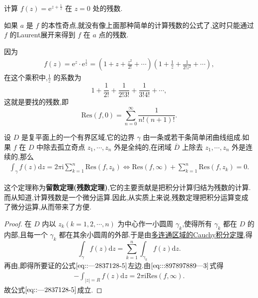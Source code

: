 \documentclass[../../main.tex]{subfiles}%
\begin{document}
\begin{example}
计算 \( f(z) = \mathrm{e}^{z + \frac{1}{z}} \) 在 \( z = 0 \) 处的残数.
\end{example}
\begin{remark}
如果 \( a \) 是 \( f \) 的本性奇点,就没有像上面那种简单的计算残数的公式了,这时只能通过 \( f \) 的Laurent展开来得到 \( f \) 在 \( a \) 点的残数.
\end{remark}
\begin{solution}
因为
\begin{align*}
f(z) = \mathrm{e}^z \cdot \mathrm{e}^{\frac{1}{z}} = \left( 1 + z + \frac{z^2}{2!} + \cdots \right) \left( 1 + \frac{1}{z} + \frac{1}{2! z^2} + \cdots \right),
\end{align*}
在这个乘积中,\( \frac{1}{z} \) 的系数为
\[
1 + \frac{1}{2!} + \frac{1}{2! 3!} + \frac{1}{3! 4!} + \cdots,
\]
这就是要找的残数,即
\[
\mathrm{Res}(f,0) = \sum_{n = 0}^{\infty} \frac{1}{n! (n + 1)!}.
\]

\end{solution}

\begin{theorem}\label{theorem:留数定理(残数定理)-定理5.4.9}
设 \( D \) 是复平面上的一个有界区域,它的边界 \( \gamma \) 由一条或若干条简单闭曲线组成.如果 \( f \) 在 \( D \) 中除去孤立奇点 \( z_1, \cdots, z_n \) 外是全纯的,在闭域 \( \overline{D} \) 上除去 \( z_1, \cdots, z_n \) 外是连续的,那么
\begin{align}
\int_{\gamma}{f\left( z \right) \mathrm{d}z}=2\pi \mathrm{i}\sum_{k=1}^n{\mathrm{Res}\left( f,z_k \right)}\Longleftrightarrow \mathrm{Res}\left( f,\infty \right) +\sum_{k=1}^n{\mathrm{Res}\left( f,z_k \right)}=0.\label{eq::---2837128-5}
\end{align}
\end{theorem}
\begin{remark}
这个定理称为\textbf{留数定理(残数定理)},它的主要贡献是把积分计算归结为残数的计算.而从知道,计算残数是一个微分运算.因此,从实质上来说,残数定理把积分运算变成了微分运算,从而带来了方便.
\end{remark}
\begin{proof}
在 \( D \) 内以 \( z_k (k = 1, 2, \cdots, n) \) 为中心作一小圆周 \( \gamma_k \),使得所有 \( \gamma_k \) 都在 \( D \) 的内部,且每一个 \( \gamma_k \) 都在其余小圆周的外部.于是由\hyperref[theorem:定理3.2.5]{多连通区域的Cauchy积分定理},得
\[
\int_{\gamma} f(z) \mathrm{d}z = \sum_{k = 1}^{n} \int_{\gamma_k} f(z) \mathrm{d}z.
\]
再由,即得所要证的公式\(\eqref{eq::---2837128-5}\)左边.由\(\eqref{eq:::897897889---3}\)式得
\begin{align*}
- \int_{|z| = R} f(z) \mathrm{d}z = 2\pi \mathrm{i} \mathrm{Res}(f, \infty).
\end{align*}
故公式\(\eqref{eq::---2837128-5}\)成立.
\end{proof}
\end{document}
